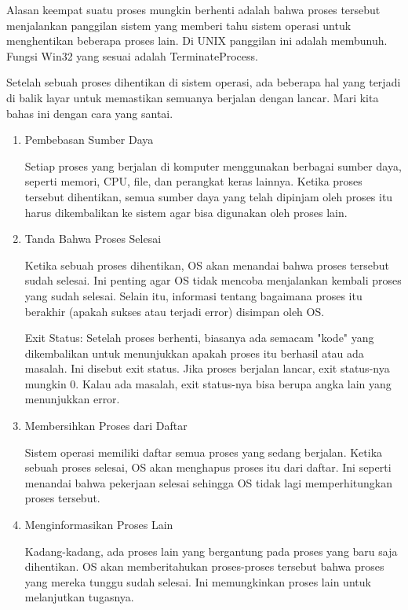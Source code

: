\documentclass[12pt]{article}
\begin{document}
\begin{itemize}
    Alasan keempat suatu proses mungkin berhenti adalah bahwa proses 
    tersebut menjalankan panggilan sistem yang memberi tahu sistem operasi untuk 
    menghentikan beberapa proses lain. Di UNIX panggilan ini adalah membunuh. 
    Fungsi Win32 yang sesuai adalah TerminateProcess.

    Setelah sebuah proses dihentikan di sistem operasi, ada beberapa hal yang terjadi di balik layar untuk memastikan semuanya berjalan dengan lancar. Mari kita bahas ini dengan cara yang santai.
    \begin{enumerate}
        \item Pembebasan Sumber Daya
        

        Setiap proses yang berjalan di komputer 
        menggunakan berbagai sumber daya, seperti 
        memori, CPU, file, dan perangkat keras lainnya. 
        Ketika proses tersebut dihentikan, semua sumber daya 
        yang telah dipinjam oleh proses itu harus dikembalikan ke 
        sistem agar bisa digunakan oleh proses lain. 
        \item Tanda Bahwa Proses Selesai
        

        Ketika sebuah proses dihentikan, OS akan menandai bahwa 
        proses tersebut sudah selesai. Ini penting agar OS tidak 
        mencoba menjalankan kembali proses yang sudah selesai. 
        Selain itu, informasi tentang bagaimana proses itu berakhir 
        (apakah sukses atau terjadi error) disimpan oleh OS.

        Exit Status: Setelah proses berhenti, biasanya ada 
        semacam "kode" yang dikembalikan untuk menunjukkan 
        apakah proses itu berhasil atau ada masalah. Ini disebut 
        exit status. Jika proses berjalan lancar, exit status-nya 
        mungkin 0. Kalau ada masalah, exit status-nya bisa berupa 
        angka lain yang menunjukkan error.

        \item Membersihkan Proses dari Daftar
        

        Sistem operasi memiliki daftar semua proses yang sedang 
        berjalan. Ketika sebuah proses selesai, OS akan menghapus 
        proses itu dari daftar. Ini seperti menandai bahwa pekerjaan 
        selesai sehingga OS tidak lagi memperhitungkan proses 
        tersebut.

        \item  Menginformasikan Proses Lain
        

        Kadang-kadang, ada proses lain yang bergantung pada proses 
        yang baru saja dihentikan. OS akan memberitahukan proses-proses 
        tersebut bahwa proses yang mereka tunggu sudah selesai. 
        Ini memungkinkan proses lain untuk melanjutkan tugasnya.


\end{enumerate}
\end{itemize}
\end{document}
